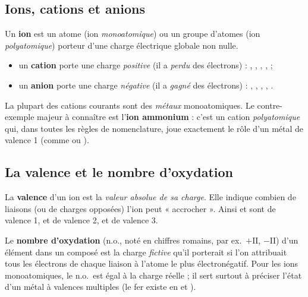 \documentclass[11pt,a4paper]{article}
\begin{document}
\subsection{Ions, cations et anions}

\begin{definition}
Un \textbf{ion} est un atome (ion \emph{monoatomique}) ou un groupe d'atomes (ion \emph{polyatomique})
porteur d'une charge électrique globale non nulle.
\begin{itemize}[leftmargin=1.6em,topsep=2pt,itemsep=1pt]
  \item un \textbf{cation} porte une charge \emph{positive} (il a \emph{perdu} des électrons) :
        , , , ,  ;
  \item un \textbf{anion} porte une charge \emph{négative} (il a \emph{gagné} des électrons) :
        , , , , .
\end{itemize}
\end{definition}

\begin{remarque}
La plupart des cations courants sont des \emph{métaux} monoatomiques. Le contre-exemple majeur à connaître
est l'\textbf{ion ammonium}  : c'est un cation \emph{polyatomique} qui, dans toutes les règles de
nomenclature, joue exactement le rôle d'un métal de valence 1 (comme  ou ).
\end{remarque}

\subsection{La valence et le nombre d'oxydation}

\begin{definition}[valence]
La \textbf{valence} d'un ion est la \emph{valeur absolue de sa charge}. Elle indique combien de liaisons
(ou de charges opposées) l'ion peut « accrocher ». Ainsi  et  sont de valence 1,
 et  de valence 2,  et  de valence 3.
\end{definition}

\begin{definition}
Le \textbf{nombre d'oxydation} (n.o., noté en chiffres romains, par ex.\ $+\mathrm{II}$, $-\mathrm{II}$)
d'un élément dans un composé est la charge \emph{fictive} qu'il porterait si l'on attribuait tous les
électrons de chaque liaison à l'atome le plus électronégatif. Pour les ions monoatomiques, le n.o.\ est
égal à la charge réelle ; il sert surtout à préciser l'état d'un métal à valences multiples (le fer
 existe en  et ).
\end{definition}
\end{document}
